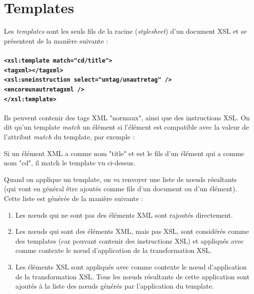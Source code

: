 \section{Templates}

Les \textit{templates} sont les seuls fils de la racine (\textit{stylesheet}) d'un document XSL et se présentent de la manière suivante :
\\
\\
\textbf{
\lstinline$<xsl:template match="cd/title">$\\
\indent \lstinline$<tagxml></tagxml>$\\
\indent \lstinline$<xsl:uneinstruction select="untag/unautretag" />$\\
\indent \lstinline$<encoreunautretagxml />$\\
\lstinline$</xsl:template>$
}
\\
\\
Ils peuvent contenir des tags XML "normaux", ainsi que des instructions XSL.
On dit qu'un template \textit{match} un élément si l'élément est compatible avec la valeur de l'attribut \textit{match} du template, par exemple :

Si un élément XML a comme nom "title" et est le fils d'un élément qui a comme nom "cd", il match le template vu ci-dessus.

Quand on applique un template, on va renvoyer une liste de nœuds résultants (qui vont en général être ajoutés comme fils d'un document ou d'un élément). Cette liste est générée de la manière suivante :\\

\begin{enumerate}
    \item Les nœuds qui ne sont pas des éléments XML sont rajoutés directement.
    \item Les nœuds qui sont des éléments XML, mais pas XSL, sont considérés comme des templates (car pouvant contenir des instructions XSL) et appliqués avec comme contexte le nœud d'application de la transformation XSL.
    \item Les éléments XSL sont appliqués avec comme contexte le nœud d'application de la transformation XSL. Tous les nœuds résultants de cette application sont ajoutés à la liste des nœuds générés par l'application du template.
\end{enumerate}